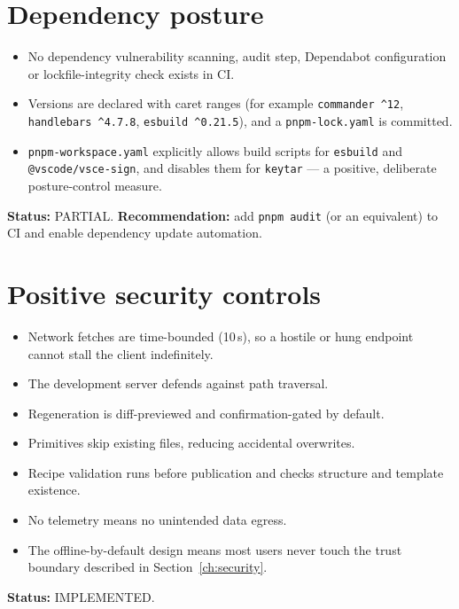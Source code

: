 \section{Dependency posture}

\begin{itemize}
  \item No dependency vulnerability scanning, audit step, Dependabot configuration
        or lockfile-integrity check exists in CI.
  \item Versions are declared with caret ranges (for example \texttt{commander
        \^{}12}, \texttt{handlebars \^{}4.7.8}, \texttt{esbuild \^{}0.21.5}), and a
        \texttt{pnpm-lock.yaml} is committed.
  \item \texttt{pnpm-workspace.yaml} explicitly allows build scripts for
        \texttt{esbuild} and \texttt{@vscode/vsce-sign}, and disables them for
        \texttt{keytar} --- a positive, deliberate posture-control measure.
\end{itemize}

\textbf{Status:} PARTIAL. \textbf{Recommendation:} add \texttt{pnpm audit} (or an
equivalent) to CI and enable dependency update automation.

\section{Positive security controls}

\begin{itemize}
  \item Network fetches are time-bounded (10\,s), so a hostile or hung endpoint
        cannot stall the client indefinitely.
  \item The development server defends against path traversal.
  \item Regeneration is diff-previewed and confirmation-gated by default.
  \item Primitives skip existing files, reducing accidental overwrites.
  \item Recipe validation runs before publication and checks structure and template
        existence.
  \item No telemetry means no unintended data egress.
  \item The offline-by-default design means most users never touch the trust
        boundary described in Section~\ref{ch:security}.
\end{itemize}

\textbf{Status:} IMPLEMENTED.


